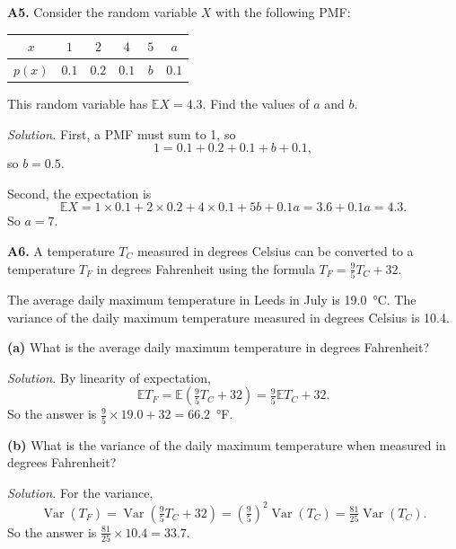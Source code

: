 \documentclass[
  a4paper,
]{book}
\theoremstyle{definition}
\theoremstyle{definition}
\theoremstyle{definition}
\theoremstyle{definition}
\theoremstyle{remark}
\begin{document}
\textbf{A5.} Consider the random variable \(X\) with the following PMF:

\begin{longtable}[]{@{}cccccc@{}}
\toprule\noalign{}
\(x\) & \(1\) & \(2\) & \(4\) & \(5\) & \(a\) \\
\midrule\noalign{}
\endhead
\bottomrule\noalign{}
\endlastfoot
\(p(x)\) & \(0.1\) & \(0.2\) & \(0.1\) & \(b\) & \(0.1\) \\
\end{longtable}

This random variable has \(\mathbb EX = 4.3\). Find the values of \(a\) and \(b\).

\begin{myanswers}
\emph{Solution.}
First, a PMF must sum to 1, so
\[ 1 = 0.1 + 0.2 + 0.1 + b + 0.1 , \]
so \(b = 0.5\).

Second, the expectation is
\[
\mathbb EX = 1\times0.1 + 2 \times 0.2 + 4 \times 0.1 + 5b + 0.1a 
           = 3.6 + 0.1a 
           = 4.3 .
\]
So \(a = 7\).

\end{myanswers}

\textbf{A6.} A temperature \(T_C\) measured in degrees Celsius can be converted to a temperature \(T_F\) in degrees Fahrenheit using the formula \(T_F = \frac95 T_C + 32\).

The average daily maximum temperature in Leeds in July is 19.0~°C. The variance of the daily maximum temperature measured in degrees Celsius is 10.4.

\textbf{(a)} What is the average daily maximum temperature in degrees Fahrenheit?

\begin{myanswers}
\emph{Solution.}
By linearity of expectation,
\[ \mathbb E T_F = \mathbb E\left(\tfrac95T_C + 32\right) = \tfrac95 \mathbb ET_C + 32 . \]
So the answer is \(\frac95 \times 19.0 + 32 = 66.2\)~°F.

\end{myanswers}

\textbf{(b)} What is the variance of the daily maximum temperature when measured in degrees Fahrenheit?

\begin{myanswers}
\emph{Solution.}
For the variance,
\[ \operatorname{Var}(T_F) = \operatorname{Var}\left(\tfrac95T_C + 32\right) = \left(\tfrac95\right)^2 \operatorname{Var}(T_C) = \tfrac{81}{25}\operatorname{Var}(T_C). \]
So the answer is \(\frac{81}{25} \times 10.4 = 33.7\).

\end{myanswers}
\end{document}
